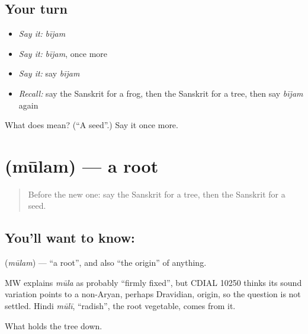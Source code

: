 \subsection*{Your turn}
\begin{itemize}
\raggedright
  \item \emph{Say it:} \emph{bījam}
  \item \emph{Say it:} \emph{bījam}, once more
  \item \emph{Say it:} say \emph{bījam}
  \item \emph{Recall:} say the Sanskrit for a frog, then the Sanskrit for a tree, then say \emph{bījam} again
\end{itemize}

\begin{tcolorbox}[breakable,colback=teal!4,colframe=teal!35!black,title={Before you move on}]
What does  mean? (\textquotedblleft{}A seed\textquotedblright{}.) Say it once more.
\end{tcolorbox}
\section[\texorpdfstring{\sk{मूलम्} (mūlam)}{मूलम् (mūlam)}]{ (mūlam) — a root}

\label{lesson:SA-C81-root}



\begin{quote}
Before the new one: say the Sanskrit for a tree, then the Sanskrit for a seed.
\end{quote}

\subsection*{You'll want to know: }
\textbf{} (\emph{mūlam}) — \textquotedblleft{}a root\textquotedblright{}, and also \textquotedblleft{}the origin\textquotedblright{} of anything.

\begin{cousinweb}
MW explains \emph{mūla} as probably \textquotedblleft{}firmly fixed\textquotedblright{}, but CDIAL 10250 thinks its sound variation points to a non-Aryan, perhaps Dravidian, origin, so the question is not settled. Hindi \emph{mūlī}, \textquotedblleft{}radish\textquotedblright{}, the root vegetable, comes from it.
\end{cousinweb}

\begin{grammarlens}[title={What you've built}]
What holds the tree down.
\end{grammarlens}

